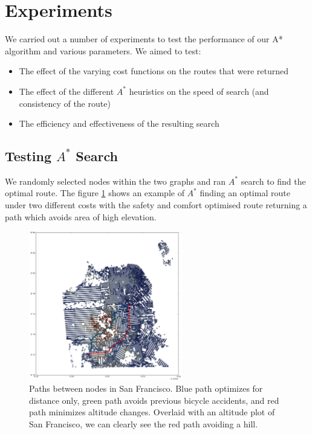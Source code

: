 \documentclass[11pt]{article}
\begin{document}
\section{Experiments}
We carried out a number of experiments to test the performance of our A* algorithm and various parameters. We aimed to test:
\begin{itemize}
\item The effect of the varying cost functions on the routes that were returned
\item The effect of the different $A^{*}$ heuristics on the speed of search (and consistency of the route)
\item The efficiency and effectiveness of the resulting search
\end{itemize}

\subsection{Testing $A^{*}$ Search}
We randomly selected nodes within the two graphs and ran $A^{*}$ search to find the optimal route. The figure \ref{fig:connected_san_fran} shows an example of $A^{*}$ finding an optimal route under two different costs with the safety and comfort optimised route returning a path which avoids area of high elevation. 

\begin{figure}
\center
\includegraphics[width=0.6\textwidth]{../images/sf_new_plot_2.png}
\caption{Paths between nodes in San Francisco. Blue path optimizes for distance only, green path avoids previous bicycle accidents, and red path minimizes altitude changes. Overlaid with an altitude plot of San Francisco, we can clearly see the red path avoiding a hill.}
\label{fig:connected_san_fran}
\end{figure}
\end{document}
